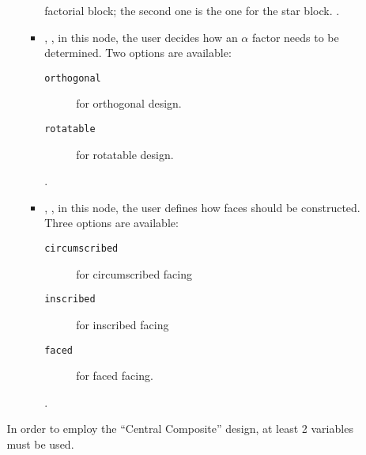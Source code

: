 \begin{itemize}
\begin{itemize}
\begin{itemize}
\begin{itemize}
        factorial block; the second one is the one for the star block.
        .
      \item {}, , in this node,
        the user decides how an $\alpha$ factor needs to be determined.
        Two options are available:
        \begin{description}
          \item[\texttt{orthogonal}] for orthogonal design.
          \item[\texttt{rotatable}] for rotatable design.
        \end{description}
        .
      \item {}, , in this node,
        the user defines how faces should be constructed.
        Three options are available:
        \begin{description}
          \item[\texttt{circumscribed}] for circumscribed facing
          \item[\texttt{inscribed}] for inscribed facing
          \item[\texttt{faced}] for faced facing.
        \end{description}
        .
     \end{itemize}
  \end{itemize}
  \nb In order to employ the ``Central Composite'' design, at least 2
  variables must be used.
\end{itemize}
\end{itemize}



